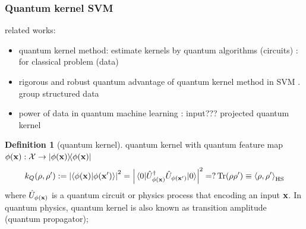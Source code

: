 \documentclass[
10pt,
aps,
pra,
linenumbers,
floatfix,
]{revtex4-2}
\theoremstyle{plain}
\theoremstyle{definition}
\newtheorem{definition}{Definition}
\newcommand{\U}{\hat{U}}
\newcommand{\dm}{\rho}
\begin{document}
\subsubsection{Quantum kernel SVM}
related works:
\begin{itemize}
	\item quantum kernel method: estimate kernels by quantum algorithms (circuits)	\cite{havlicekSupervisedLearningQuantum2019}
	\cite{schuldQuantumMachineLearning2019}: for classical problem (data)

	\item rigorous and robust quantum advantage of quantum kernel method in SVM \cite{liuRigorousRobustQuantum2021}. group structured data \cite{glickCovariantQuantumKernels2021}

	\item power of data in quantum machine learning \cite{huangPowerDataQuantum2021}: input??? projected quantum kernel
\end{itemize}
\begin{definition}[quantum kernel]\label{def:quantum_kernel}
	quantum kernel 
	with quantum feature map $\phi(\vb{x}): \mathcal{X}\to \op{\phi(\vb{x})}$
	\begin{equation}
		k_Q(\rho,\rho') := \abs{\ip{\phi(\vbx)}{\phi(\vbx')}}^2 =\abs{\mel{0}{\U_{\phi(\vbx)}^\dagger \U_{\phi(\vbx')} }{0}}^2 =? \Tr(\rho\rho') \equiv \expval{\dm,\dm'}_{\textup{HS}}
	\end{equation}
	where $\U_{\phi(\vbx)}$ is a quantum circuit or physics process that encoding an input $\vb{x}$.
	In quantum physics, quantum kernel is also known as transition amplitude (quantum propagator);
\end{definition}
\end{document}
